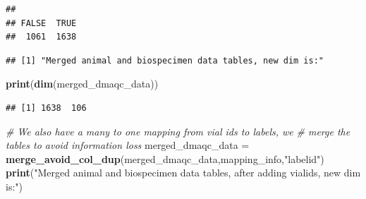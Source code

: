 \documentclass[]{article}
\newenvironment{Shaded}{\begin{snugshade}}{\end{snugshade}}
\newcommand{\KeywordTok}[1]{\textcolor[rgb]{0.13,0.29,0.53}{\textbf{#1}}}
\newcommand{\DataTypeTok}[1]{\textcolor[rgb]{0.13,0.29,0.53}{#1}}
\newcommand{\StringTok}[1]{\textcolor[rgb]{0.31,0.60,0.02}{#1}}
\newcommand{\CommentTok}[1]{\textcolor[rgb]{0.56,0.35,0.01}{\textit{#1}}}
\newcommand{\OperatorTok}[1]{\textcolor[rgb]{0.81,0.36,0.00}{\textbf{#1}}}
\newcommand{\NormalTok}[1]{#1}
\begin{document}
\begin{verbatim}
## 
## FALSE  TRUE 
##  1061  1638
\end{verbatim}

\begin{Shaded}
\end{Shaded}

\begin{verbatim}
## [1] "Merged animal and biospecimen data tables, new dim is:"
\end{verbatim}

\begin{Shaded}
\begin{Highlighting}[]
\KeywordTok{print}\NormalTok{(}\KeywordTok{dim}\NormalTok{(merged_dmaqc_data))}
\end{Highlighting}
\end{Shaded}

\begin{verbatim}
## [1] 1638  106
\end{verbatim}

\begin{Shaded}
\begin{Highlighting}[]
\CommentTok{# We also have a many to one mapping from vial ids to labels, we }
\CommentTok{# merge the tables to avoid information loss}
\NormalTok{merged_dmaqc_data =}\StringTok{ }\KeywordTok{merge_avoid_col_dup}\NormalTok{(merged_dmaqc_data,mapping_info,}\StringTok{"labelid"}\NormalTok{)}
\KeywordTok{print}\NormalTok{(}\StringTok{"Merged animal and biospecimen data tables, after adding vialids, new dim is:"}\NormalTok{)}
\end{Highlighting}
\end{Shaded}
\end{document}

